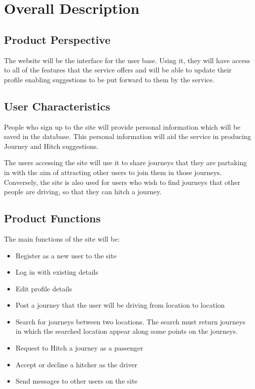 \documentclass[11pt]{article}
\begin{document}
\section{Overall Description}
\subsection{Product Perspective}
The website will be the interface for the user base. Using it, they will have access to all of the features that the service offers and will be able to update their profile enabling suggestions to be put forward to them by the service.

\subsection{User Characteristics}
People who sign up to the site will provide personal information which will be saved in the database. This personal information will aid the service in producing Journey and Hitch suggestions. 

The users accessing the site will use it to share journeys that they are partaking in with the aim of attracting other users to join them in those journeys. Conversely, the site is also used for users who wish to find journeys that other people are driving, so that they can hitch a journey.

\subsection{Product Functions}
The main functions of the site will be:
\begin{itemize}
\item Register as a new user to the site
\item Log in with existing details
\item Edit profile details
\item Post a journey that the user will be driving from location to location
\item Search for journeys between two locations. The search must return journeys in which the searched location appear along some points on the journeys.
\item Request to Hitch a journey as a passenger
\item Accept or decline a hitcher as the driver
\item Send messages to other users on the site
\end{itemize}
\end{document}
